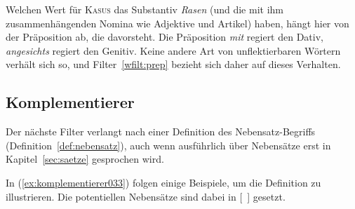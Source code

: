 Welchen Wert für \textsc{Kasus} das Substantiv \textit{Rasen} (und die mit ihm zusammenhängenden Nomina wie Adjektive und Artikel) haben, hängt hier von der Präposition ab, die davorsteht.
Die Präposition \textit{mit} regiert den Dativ, \textit{angesichts} regiert den Genitiv.
Keine andere Art von unflektierbaren Wörtern verhält sich so, und Filter~\ref{wfilt:prep} bezieht sich daher auf dieses Verhalten.


\subsection{Komplementierer}
\label{sec:komplementierer}


Der nächste Filter verlangt nach einer Definition des Nebensatz-Begriffs (Definition~\ref{def:nebensatz}), auch wenn ausführlich über Nebensätze erst in Kapitel~\ref{sec:saetze} gesprochen wird.


In (\ref{ex:komplementierer033}) folgen einige Beispiele, um die Definition zu illustrieren.
Die potentiellen Nebensätze sind dabei in [~] gesetzt.

\begin{exe}
  \ex\label{ex:komplementierer033}\begin{xlist}
  \end{xlist}
\end{exe}

